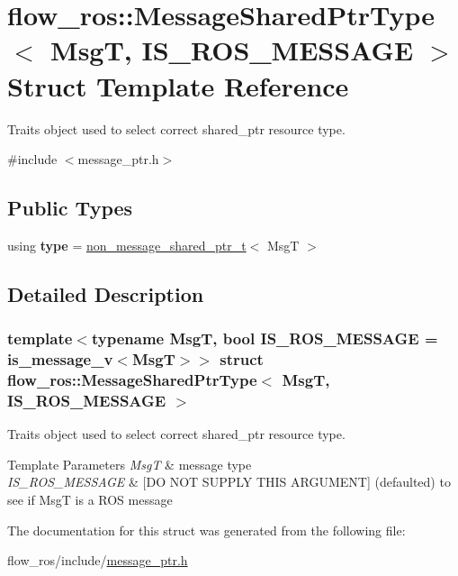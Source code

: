 \hypertarget{structflow__ros_1_1_message_shared_ptr_type}{}\section{flow\+\_\+ros\+:\+:Message\+Shared\+Ptr\+Type$<$ MsgT, I\+S\+\_\+\+R\+O\+S\+\_\+\+M\+E\+S\+S\+A\+GE $>$ Struct Template Reference}
\label{structflow__ros_1_1_message_shared_ptr_type}


Traits object used to select correct shared\+\_\+ptr resource type.  




{\ttfamily \#include $<$message\+\_\+ptr.\+h$>$}

\subsection*{Public Types}
\begin{DoxyCompactItemize}
\item 
\mbox{\label{structflow__ros_1_1_message_shared_ptr_type_aa79edee80bae6b91f849accaf772c92b}} 
using {\bfseries type} = \hyperlink{namespaceflow__ros_aa27be896eb2c4c34fef0e9b7dd444d4c}{non\+\_\+message\+\_\+shared\+\_\+ptr\+\_\+t}$<$ MsgT $>$
\end{DoxyCompactItemize}


\subsection{Detailed Description}
\subsubsection*{template$<$typename MsgT, bool I\+S\+\_\+\+R\+O\+S\+\_\+\+M\+E\+S\+S\+A\+GE = is\+\_\+message\+\_\+v$<$\+Msg\+T$>$$>$\newline
struct flow\+\_\+ros\+::\+Message\+Shared\+Ptr\+Type$<$ Msg\+T, I\+S\+\_\+\+R\+O\+S\+\_\+\+M\+E\+S\+S\+A\+G\+E $>$}

Traits object used to select correct shared\+\_\+ptr resource type. 


\begin{DoxyTemplParams}{Template Parameters}
{\em MsgT} & message type \\
\hline
{\em I\+S\+\_\+\+R\+O\+S\+\_\+\+M\+E\+S\+S\+A\+GE} & \mbox{[}DO N\+OT S\+U\+P\+P\+LY T\+H\+IS A\+R\+G\+U\+M\+E\+NT\mbox{]} (defaulted) to see if MsgT is a R\+OS message \\
\hline
\end{DoxyTemplParams}


The documentation for this struct was generated from the following file\+:\begin{DoxyCompactItemize}
\item 
flow\+\_\+ros/include/\hyperlink{message__ptr_8h}{message\+\_\+ptr.\+h}\end{DoxyCompactItemize}
